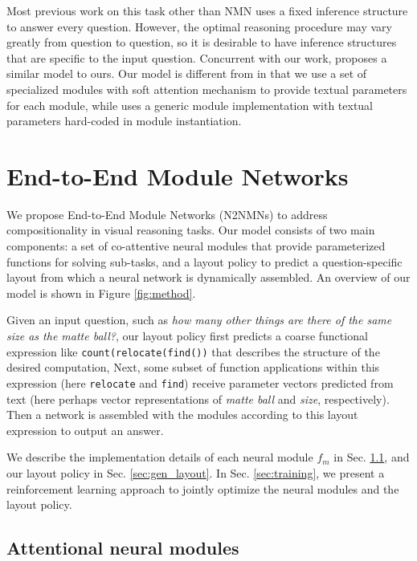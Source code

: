 \documentclass[10pt,twocolumn,letterpaper]{article}
\begin{document}
Most previous work on this task other than NMN uses a fixed inference structure to answer every question. However, the optimal reasoning procedure may vary greatly from question to question, so it is desirable to have inference structures that are specific to the input question. Concurrent with our work, \cite{johnson2017inferring} proposes a similar model to ours. Our model is different from \cite{johnson2017inferring} in that we use a set of specialized modules with soft attention mechanism to provide textual parameters for each module, while \cite{johnson2017inferring} uses a generic module implementation with textual parameters hard-coded in module instantiation.

\section{End-to-End Module Networks}

We propose End-to-End Module Networks (N2NMNs) to address compositionality in visual reasoning tasks. Our model consists of two main components: a set of co-attentive neural modules that provide parameterized functions for solving sub-tasks, and a layout policy to predict a question-specific layout from which a neural network is dynamically assembled. An overview of our model is shown in Figure \ref{fig:method}.

Given an input question, such as \emph{how many other things are there of the same size as the matte ball?}, our layout policy first predicts a coarse functional expression like \texttt{count(relocate(find())} that describes the structure of the desired computation, Next, some subset of function applications within this expression (here \texttt{relocate} and \texttt{find}) receive parameter vectors predicted from text (here perhaps vector representations of \emph{matte ball} and \emph{size}, respectively). Then a network is assembled with the modules according to this layout expression to output an answer.

We describe the implementation details of each neural module $f_m$ in Sec. \ref{sec:modules}, and our layout policy in Sec. \ref{sec:gen_layout}. In Sec. \ref{sec:training}, we present a reinforcement learning approach to jointly optimize the neural modules and the layout policy.

\subsection{Attentional neural modules}\label{sec:modules}
\end{document}
